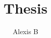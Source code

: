 \documentclass[11pt,a4paper,openany]{book}
\title{Thesis}
\author{Alexis B}
\date{}
\begin{document}
\maketitle{}
\mainmatter

\tableofcontents{}


\end{document}
